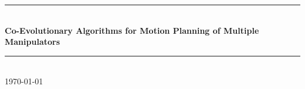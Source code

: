 \documentclass[12pt]{article} %
\begin{document}

\begin{titlepage}

\newcommand{\HRule}{\rule{\linewidth}{0.5mm}} %

\center %


\HRule \\[0.4cm]
{ \huge \bfseries Co-Evolutionary Algorithms for Motion Planning of Multiple Manipulators}\\ [0.4cm] %
\HRule \\[1.5cm]


{\large \today}\\[3cm] %


\vfill %

\end{titlepage}
\end{document}
